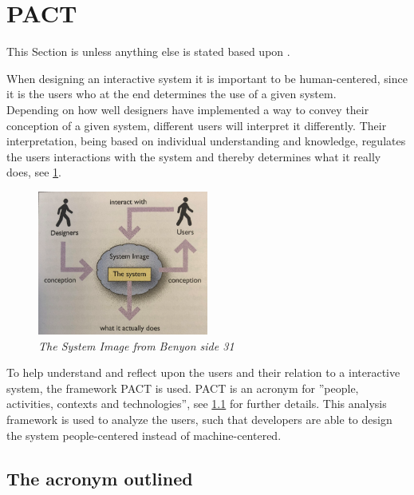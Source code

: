 \section{PACT}\label{sec:PACT}
This Section is unless anything else is stated based upon \cite{Benyon}.

When designing an interactive system it is important to be human-centered, since it is the users who at the end determines the use of a given system.
\\\indent
Depending on how well designers have implemented a way to convey their conception of a given system, different users will interpret it differently. 
Their interpretation, being based on individual understanding and knowledge, regulates the users interactions with the system and thereby determines what it really does, see \cref{fig:PACT-SystemImage}.

\begin{figure}[H]
	\centering
	\includegraphics[width=0.5\textwidth]{billeder/SystemImage-Benyon.png}
	\caption{\textit{The System Image from {\color{red}Benyon side 31}}}
	\label{fig:PACT-SystemImage}
\end{figure}

To help understand and reflect upon the users and their relation to a interactive system, the framework PACT is used. 
PACT is an acronym for ''people, activities, contexts and technologies'', see \cref{sec:PACT-method} for further details.
This analysis framework is used to analyze the users, such that developers are able to design the system people-centered instead of machine-centered.

\subsection{The acronym outlined}\label{sec:PACT-method}
